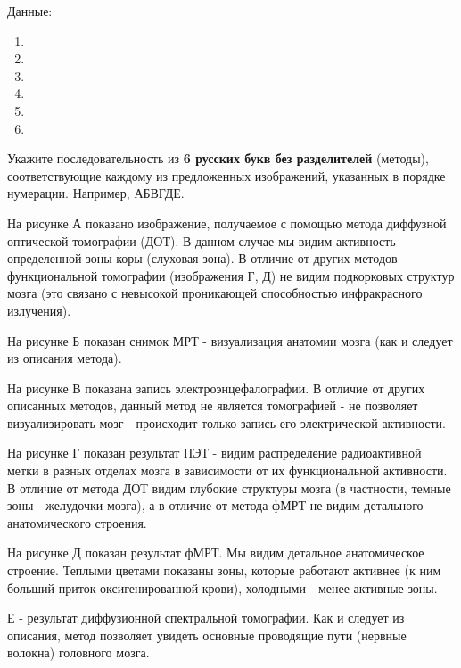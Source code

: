 Данные:
\begin{enumerate}
    \item
    \item
    \item
    \item
    \item
    \item
\end{enumerate}

Укажите последовательность из \textbf{6 русских букв без разделителей} (методы), соответствующие каждому из предложенных изображений, указанных в порядке нумерации. Например, АБВГДЕ.

\explanationSection

На рисунке А показано изображение, получаемое с помощью метода диффузной оптической томографии (ДОТ). В данном случае мы видим активность определенной зоны коры (слуховая зона). В отличие от других методов функциональной томографии (изображения Г, Д) не видим подкорковых структур мозга (это связано с невысокой проникающей способностью инфракрасного излучения).

На рисунке Б показан снимок МРТ - визуализация анатомии мозга (как и следует из описания метода). 

На рисунке В показана запись электроэнцефалографии. В отличие от других описанных методов, данный метод не является томографией - не позволяет визуализировать мозг - происходит только запись его электрической активности. 

На рисунке Г показан результат ПЭТ - видим распределение радиоактивной метки в разных отделах мозга в зависимости от их функциональной активности. В отличие от метода ДОТ видим глубокие структуры мозга (в частности, темные зоны - желудочки мозга), а в отличие от метода фМРТ не видим детального анатомического строения.

На рисунке Д показан результат фМРТ. Мы видим детальное анатомическое строение. Теплыми цветами показаны зоны, которые работают активнее (к ним больший приток оксигенированной крови), холодными - менее активные зоны. 

Е - результат диффузионной спектральной томографии. Как и следует из описания, метод позволяет увидеть основные проводящие пути (нервные волокна) головного мозга. 

